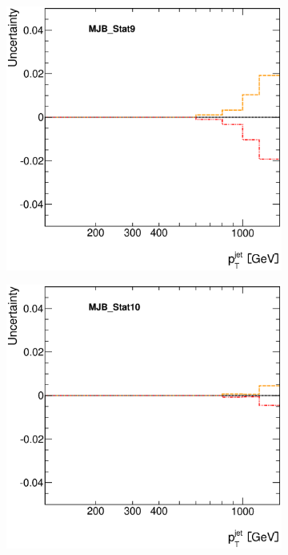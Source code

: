 \documentclass[12pt, twoside]{article}
\numberwithin{equation}{section}
\numberwithin{figure}{section}
\newenvironment{changemargin}[2]{%
\begin{list}{}{%
\setlength{\topsep}{0pt}%
\setlength{\leftmargin}{#1}%
\setlength{\rightmargin}{#2}%
\setlength{\listparindent}{\parindent}%
\setlength{\itemindent}{\parindent}%
\setlength{\parsep}{\parskip}%
}%
\item[]}{\end{list}}
\begin{document}
\begin{figure}[H]
\begin{changemargin}{-1.0cm}{-0.75cm}
\begin{changemargin}{-0.75cm}{-1.0cm}
\begin{subfigure}[b]{0.25\textwidth}
        \end{subfigure}
        \begin{subfigure}[b]{0.25\textwidth}
            \includegraphics[width=\textwidth]{./images/JetSystematics/JetSystematic-35.eps}
        \end{subfigure}
        \begin{subfigure}[b]{0.25\textwidth}
            \includegraphics[width=\textwidth]{./images/JetSystematics/JetSystematic-36.eps}
        \end{subfigure}


\end{changemargin}
\end{changemargin}
\end{figure}
\end{document}

